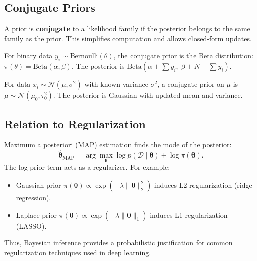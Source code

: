 \documentclass{tufte-handout}
\begin{document}
\begin{marginfigure}
\centering
{}
\caption{Prior, likelihood, and posterior. The posterior shrinks toward the likelihood when data are informative.}
\end{marginfigure}

\subsection{Conjugate Priors}

A prior is \textbf{conjugate} to a likelihood family if the posterior belongs to the same family as the prior. This simplifies computation and allows closed‑form updates.

\begin{exmp}
    For binary data $y_i \sim \text{Bernoulli}(\theta)$, the conjugate prior is the Beta distribution: $\pi(\theta) = \text{Beta}(\alpha, \beta)$. The posterior is $\text{Beta}(\alpha + \sum y_i,\; \beta + N - \sum y_i)$.
\end{exmp}

\begin{exmp}
    For data $x_i \sim \mathcal{N}(\mu, \sigma^2)$ with known variance $\sigma^2$, a conjugate prior on $\mu$ is $\mu \sim \mathcal{N}(\mu_0, \tau_0^2)$. The posterior is Gaussian with updated mean and variance.
\end{exmp}

\subsection{Relation to Regularization}

Maximum a posteriori (MAP) estimation finds the mode of the posterior:
\[
\hat{\boldsymbol{\theta}}_{\text{MAP}} = \arg\max_{\boldsymbol{\theta}} \log p(\mathcal{D} \mid \boldsymbol{\theta}) + \log \pi(\boldsymbol{\theta}).
\]
The log‑prior term acts as a regularizer. For example:
\begin{itemize}
    \item Gaussian prior $\pi(\boldsymbol{\theta}) \propto \exp(-\lambda \|\boldsymbol{\theta}\|_2^2)$ induces L2 regularization (ridge regression).
    \item Laplace prior $\pi(\boldsymbol{\theta}) \propto \exp(-\lambda \|\boldsymbol{\theta}\|_1)$ induces L1 regularization (LASSO).
\end{itemize}
Thus, Bayesian inference provides a probabilistic justification for common regularization techniques used in deep learning.
\end{document}
